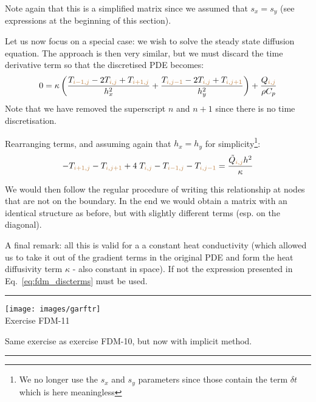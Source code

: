 \begin{landscape}
Note again that this is a simplified matrix since we assumed that $s_x=s_y$ (see expressions
at the beginning of this section).
\end{landscape}

Let us now focus on a special case: we wish to solve the steady state diffusion equation. 
The approach is then very similar, but we must discard the time derivative term so that 
the discretised PDE becomes:
\begin{equation}
0
= \kappa
\left(
\frac{ T_{{\color{brown}i-1,j}}-2T_{{\color{brown}i,j}}+T_{{\color{brown}i+1,j}} }{h_x^2} + 
\frac{ T_{{\color{brown}i,j-1}}-2T_{{\color{brown}i,j}}+T_{{\color{brown}i,j+1}} }{h_y^2}
\right)
+\frac{Q_{{\color{brown}i,j}}}{\rho C_p}
\end{equation}
Note that we have removed the superscript $n$ and $n+1$ since there is no time discretisation.

Rearranging terms, and assuming again that $h_x=h_y$ for simplicity\footnote{We no longer use the $s_x$
and $s_y$ parameters since those contain the term $\delta t$ which is here meaningless}:
\begin{equation}
- T_{{\color{brown}i+1,j}}
- T_{{\color{brown}i,j+1}}
+4 \; T_{{\color{brown}i,j}}
-  T_{{\color{brown}i-1,j}}
-  T_{{\color{brown}i,j-1}}
=
\frac{ \tilde{Q}_{{\color{brown}i,j}} h^2} {\kappa }
\end{equation}

We would then follow the regular procedure of writing this relationship at nodes that are not on the boundary.
In the end we would obtain a matrix with an identical structure as before, but with slightly different terms
(esp. on the diagonal). 

A final remark: all this is valid for a a constant heat conductivity (which allowed us to take it out of 
the gradient terms in the original PDE and form the heat diffusivity term $\kappa$ - also constant in space).
If not the expression presented in Eq.~\eqref{eq:fdm_discterms} must be used. 




















\begin{center}
\begin{minipage}[t]{0.77\textwidth}
\par\noindent\rule{\textwidth}{0.4pt}
\begin{center}
\texttt{[image: images/garftr]} \\
{\color{orange}Exercise FDM-11}
\end{center}

Same exercise as exercise FDM-10, but now with implicit method.

\par\noindent\rule{\textwidth}{0.4pt}
\end{minipage}
\end{center}



